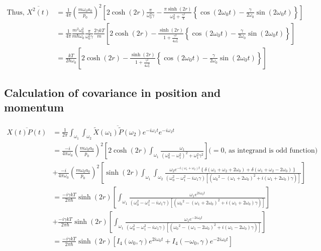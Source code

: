 \documentclass[12pt, twoside]{article}
\begin{document}
\begin{equation}\begin{aligned} \text{Thus, }
\overline{X ^ { 2 } ( t )} &= \frac{1}{4\pi}\left(\frac { m \omega _ { 0 } a_0 } { p _ { 0 } }\right)^2 \left[2\cosh(2r)\frac{\pi}{\omega_0 ^2 \gamma} - \frac{\pi\sinh(2r)}{\omega_0 ^2+ \frac{\gamma^2}{4}}\left\{\cos(2\omega_0 t) - \frac{\gamma}{2 \omega_0}\sin(2\omega_0 t)\right\}\right] \\& = \frac{1}{4\pi} \frac{m^2 \omega_0^2}{m \hbar \omega_0} \frac{\pi}{\omega_0 ^2 \gamma} \frac{2\gamma k T}{m} \left[2\cosh(2r) - \frac{\sinh(2r)}{1 + \frac{\gamma^2}{4\omega_0 ^2}}\left\{\cos(2\omega_0 t) - \frac{\gamma}{2 \omega_0}\sin(2\omega_0 t)\right\}\right] \\& = \frac{kT}{2 \hbar \omega_0} \left[2\cosh(2r) - \frac{\sinh(2r)}{1 + \frac{\gamma^2}{4\omega_0 ^2}}\left\{\cos(2\omega_0 t) - \frac{\gamma}{2 \omega_0}\sin(2\omega_0 t)\right\}\right]
\end{aligned}\end{equation}
\subsection{Calculation of covariance in position and momentum}
$\begin{aligned} \overline{X( t ) P(t)} &= \frac { 1 } { 2 \pi } \int _ { \omega _ { 1 }}\int_{\omega_2} \overline{\widetilde { X } ( \omega_1 )\widetilde { P } ( \omega_2 )}  e ^ { - i \omega _ { 1 } t } e ^ { - i \omega _ { 2 } t } \\ &= \frac{-i}{4\pi \omega_0}\left(\frac { m \omega _ { 0 } a_0 } { p _ { 0 } }\right)^2 \left[ 2 \cosh(2r) \int_{\omega_1} \frac{\omega_1}{(\omega_0^2 - \omega_1 ^2)^2 + \omega_1 ^2 \gamma^2}\right] \text{($=0$, as integrand is odd function)} \\&+ \frac{-i}{4\pi\omega_0}\left(\frac { m \omega _ { 0 } a_0 } { p _ { 0 } }\right)^2 \left[ \sinh(2r) \int_{\omega_1}\int_{\omega_2} \frac{\omega_2 e^{-i(\omega_1 + \omega_2) t} \left\{\delta(\omega_1 + \omega_2 + 2\omega_0) + \delta(\omega_1 + \omega_2 - 2\omega_0) \right\}}{(\omega_0^2 - \omega_1 ^2 - i\omega_1\gamma) [({\omega_0}^2 - (\omega_1 + 2\omega_0)^2 + i(\omega_1 + 2 \omega_0) \gamma)]}\right] \\&= \frac{-i\gamma k T}{2 \pi \hbar} \sinh(2r) \left[\int_{\omega_1} \frac{\omega_1 e^{2i\omega_0 t}}{(\omega_0^2 - \omega_1 ^2 - i\omega_1\gamma) [({\omega_0}^2 - (\omega_1 + 2\omega_0)^2 + i(\omega_1 + 2 \omega_0) \gamma)]} \right] \\ &+ \frac{-i\gamma k T}{2 \pi \hbar} \sinh(2r) \left[\int_{\omega_1} \frac{\omega_1 e^{-2i\omega_0 t}}{(\omega_0^2 - \omega_1 ^2 - i\omega_1\gamma) [({\omega_0}^2 - (\omega_1 - 2\omega_0)^2 + i(\omega_1 - 2 \omega_0) \gamma)]}   \right] \\& = \frac{-i\gamma k T}{2 \pi \hbar} \sinh(2r) \left[I_4(\omega_0,\gamma) e^{2i\omega_0 t} + I_4(-\omega_0,\gamma)e^{-2i\omega_0 t}\right]
\end{aligned}$
\end{document}
